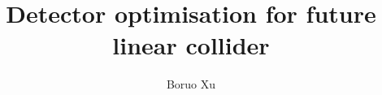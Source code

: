 \documentclass[hyperpdf,bindnopdf]{hepthesis}
\title{Detector optimisation for future linear collider}
\author{Boruo Xu}
\begin{document}
\begin{frontmatter}
  
\end{frontmatter}

\begin{mainmatter}
  
  
  
  
  
  
\end{mainmatter}

\begin{appendices}
\end{appendices}

\begin{backmatter}
  
\end{backmatter}

\end{document}
